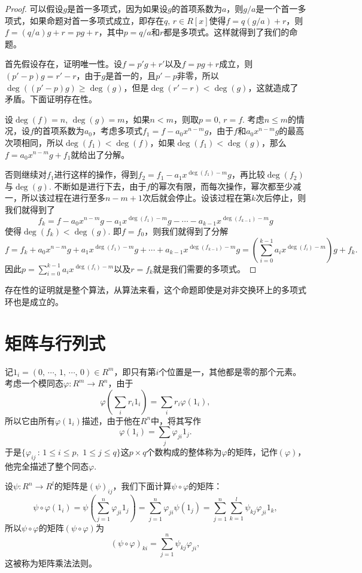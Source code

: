 \begin{proof}
	可以假设$g$是首一多项式，因为如果设$g$的首项系数为$a$，则$g/a$是一个首一多项式，如果命题对首一多项式成立，即存在$q$, $r\in R[x]$使得$f=q(g/a)+r$，则$f=(q/a)g+r=pg+r$，其中$p=q/a$和$r$都是多项式。这样就得到了我们的命题。

	首先假设存在，证明唯一性。设$f=p'g+r'$以及$f=pg+r$成立，则$(p'-p)g=r'-r$，由于$g$是首一的，且$p'-p$非零，所以$\deg((p'-p)g)\geq \deg(g)$，但是$\deg(r'-r)< \deg(g)$，这就造成了矛盾。下面证明存在性。

	设$\deg(f)=n$, $\deg(g)=m$，如果$n<m$，则取$p=0$, $r=f$. 考虑$n\leq m$的情况，设$f$的首项系数为$a_0$，考虑多项式$f_1=f-a_0x^{n-m}g$，由于$f$和$a_0x^{n-m}g$的最高次项相同，所以$\deg(f_1)<\deg(f)$，如果$\deg(f_1)<\deg(g)$，那么$f=a_0x^{n-m}g+f_1$就给出了分解。

	否则继续对$f_1$进行这样的操作，得到$f_2=f_1-a_1x^{\deg(f_1)-m}g$，再比较$\deg(f_2)$与$\deg(g)$. 不断如是进行下去，由于$f$的幂次有限，而每次操作，幂次都至少减一，所以该过程在进行至多$n-m+1$次后就会停止。设该过程在第$k$次后停止，则我们就得到了
	\[
	f_{k}=f-a_0x^{n-m}g-a_1x^{\deg(f_1)-m}g-\cdots-a_{k-1}x^{\deg(f_{k-1})-m}g
	\]
	使得$\deg(f_k)< \deg(g)$. 即$f=f_0$，则我们就得到了分解
	\[
	f=f_k+a_0x^{n-m}g+a_1x^{\deg(f_1)-m}g+\cdots+a_{k-1}x^{\deg(f_{k-1})-m}g=\left(\sum_{i=0}^{k-1}a_{i}x^{\deg(f_{i})-m}\right)g+f_k.
	\]
	因此$p=\sum_{i=0}^{k-1}a_{i}x^{\deg(f_{i})-m}$以及$r=f_k$就是我们需要的多项式。
\end{proof}

存在性的证明就是整个算法，从算法来看，这个命题即使是对非交换环上的多项式环也是成立的。

\section{矩阵与行列式}

\para 记$1_i=(0,\,\cdots\!,\,1,\,\cdots\!,\,0)\in R^m$，即只有第$i$个位置是一，其他都是零的那个元素。考虑一个模同态$\varphi:R^m\to R^n$，由于
\[
	\varphi\left(\sum_{i} r_i1_i\right)=\sum_{i} r_i\varphi\left(1_i\right),
\]
所以它由所有$\varphi\left(1_i\right)$描述，由于他在$R^n$中，将其写作
\[
	\varphi\left(1_i\right)=\sum_{j}\varphi_{ji}1_j.
\]
于是$\{\varphi_{ij}\,:\, 1\leq i \leq p,\,\,1\leq j \leq q\}$这$p\times q$个数构成的整体称为$\varphi$的矩阵，记作$(\varphi)$，他完全描述了整个同态$\varphi$.

设$\psi:R^n\to R^l$的矩阵是$(\psi)_{ij}$，我们下面计算$\psi\circ\varphi$的矩阵：
\[
	\psi\circ\varphi(1_i)=\psi\left(\sum_{j=1}^n\varphi_{ji}1_j\right)=\sum_{j=1}^n\varphi_{ji}\psi(1_j)=\sum_{j=1}^n\sum_{k=1}^l\psi_{kj}\varphi_{ji}1_k,
\]
所以$\psi\circ\varphi$的矩阵$(\psi\circ\varphi)$为
\[
	(\psi\circ\varphi)_{ki}=\sum_{j=1}^n\psi_{kj}\varphi_{ji},
\]
这被称为矩阵乘法法则。

